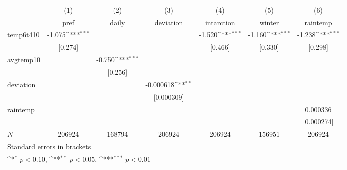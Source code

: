 {
\def\sym#1{\ifmmode^{#1}\else\(^{#1}\)\fi}
\begin{tabular}{l*{6}{c}}
\hline\hline
            &\multicolumn{1}{c}{(1)}&\multicolumn{1}{c}{(2)}&\multicolumn{1}{c}{(3)}&\multicolumn{1}{c}{(4)}&\multicolumn{1}{c}{(5)}&\multicolumn{1}{c}{(6)}\\
            &\multicolumn{1}{c}{pref}&\multicolumn{1}{c}{daily}&\multicolumn{1}{c}{deviation}&\multicolumn{1}{c}{intarction}&\multicolumn{1}{c}{winter}&\multicolumn{1}{c}{raintemp}\\
\hline
temp6t410   &      -1.075\sym{***}&                     &                     &      -1.520\sym{***}&      -1.160\sym{***}&      -1.238\sym{***}\\
            &     [0.274]         &                     &                     &     [0.466]         &     [0.330]         &     [0.298]         \\
[1em]
avgtemp10   &                     &      -0.750\sym{***}&                     &                     &                     &                     \\
            &                     &     [0.256]         &                     &                     &                     &                     \\
[1em]
deviation   &                     &                     &   -0.000618\sym{**} &                     &                     &                     \\
            &                     &                     &  [0.000309]         &                     &                     &                     \\
[1em]
raintemp    &                     &                     &                     &                     &                     &    0.000336         \\
            &                     &                     &                     &                     &                     &  [0.000274]         \\
\hline
\(N\)       &      206924         &      168794         &      206924         &      206924         &      156951         &      206924         \\
\hline\hline
\multicolumn{7}{l}{\footnotesize Standard errors in brackets}\\
\multicolumn{7}{l}{\footnotesize \sym{*} \(p<0.10\), \sym{**} \(p<0.05\), \sym{***} \(p<0.01\)}\\
\end{tabular}
}
